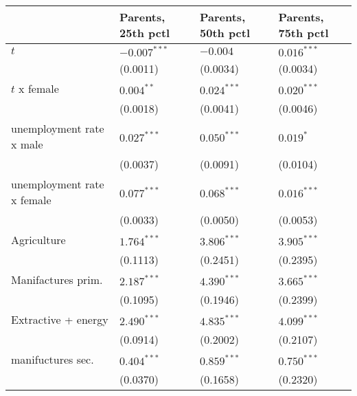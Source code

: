 \begin{tabular}{llll}
\toprule
{} & Parents, 25th pctl & Parents, 50th pctl & Parents, 75th pctl \\
\midrule
$t$                                                &     $-0.007^{***}$ &           $-0.004$ &      $0.016^{***}$ \\
                                                   &           (0.0011) &           (0.0034) &           (0.0034) \\
$t$ x female                                       &       $0.004^{**}$ &      $0.024^{***}$ &      $0.020^{***}$ \\
                                                   &           (0.0018) &           (0.0041) &           (0.0046) \\
unemployment rate x male                           &      $0.027^{***}$ &      $0.050^{***}$ &          $0.019^*$ \\
                                                   &           (0.0037) &           (0.0091) &           (0.0104) \\
unemployment rate x female                         &      $0.077^{***}$ &      $0.068^{***}$ &      $0.016^{***}$ \\
                                                   &           (0.0033) &           (0.0050) &           (0.0053) \\
Agriculture                                        &      $1.764^{***}$ &      $3.806^{***}$ &      $3.905^{***}$ \\
                                                   &           (0.1113) &           (0.2451) &           (0.2395) \\
Manifactures prim.                                 &      $2.187^{***}$ &      $4.390^{***}$ &      $3.665^{***}$ \\
                                                   &           (0.1095) &           (0.1946) &           (0.2399) \\
Extractive + energy                                &      $2.490^{***}$ &      $4.835^{***}$ &      $4.099^{***}$ \\
                                                   &           (0.0914) &           (0.2002) &           (0.2107) \\
manifuctures sec.                                  &      $0.404^{***}$ &      $0.859^{***}$ &      $0.750^{***}$ \\
                                                   &           (0.0370) &           (0.1658) &           (0.2320) \\

\end{tabular}
